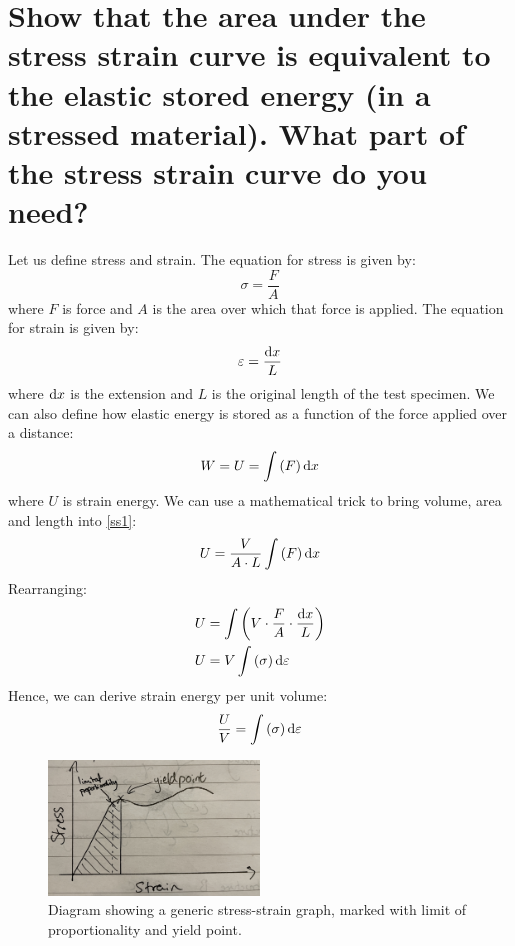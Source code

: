 \documentclass[11pt]{article}
\begin{document}
\section{Show that the area under the stress strain curve is equivalent to the elastic stored energy (in a stressed material). What part of the stress strain curve do you need?}
Let us define stress and strain. The equation for stress is given by:
\begin{equation}
    \sigma = \frac{F}{A}
\end{equation}
where $F$ is force and $A$ is the area over which that force is applied. The equation for strain is given by:
\begin{equation}
    \varepsilon = \frac{\dif x}{L}
\end{equation}
where $\dif x$ is the extension and $L$ is the original length of the test specimen. We can also define how elastic energy is stored as a function of the force applied over a distance:
\begin{equation}
    W = U = \int \left(F\right)\dif x\label{ss1}
\end{equation}
where $U$ is strain energy. We can use a mathematical trick to bring volume, area and length into \ref{ss1}:
\begin{equation}
    U = \frac{V}{A\cdot L} \int \left(F\right)\dif x
\end{equation}
Rearranging:
\begin{align}
    U &= \int\left(V\cdot \frac{F}{A}\cdot \frac{\dif x}{L}\right)\\
    U &= V\int\left(\sigma\right)\dif \varepsilon
\end{align}
Hence, we can derive strain energy per unit volume:
\begin{equation}
    \frac{U}{V} = \int \left(\sigma\right)\dif \varepsilon\label{ss2}
\end{equation}
\begin{figure}[H]
    \centering
    \includegraphics[width = 0.5\textwidth]{./img/q2a.jpg}
    \caption{Diagram showing a generic stress-strain graph, marked with limit of proportionality and yield point.}
\end{figure}
\end{document}
